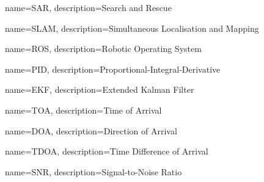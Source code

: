 \makeglossaries

{
    name=SAR,
    description={Search and Rescue}
}

{
    name=SLAM,
    description={Simultaneous Localisation and Mapping}
}

{
    name=ROS,
    description={Robotic Operating System}
}

{
    name=PID,
    description={Proportional-Integral-Derivative}
}

{
    name=EKF,
    description={Extended Kalman Filter}
}

{
    name=TOA,
    description={Time of Arrival}
}

{
    name=DOA,
    description={Direction of Arrival}
}

{
    name=TDOA,
    description={Time Difference of Arrival}
}

{
    name=SNR,
    description={Signal-to-Noise Ratio}
}